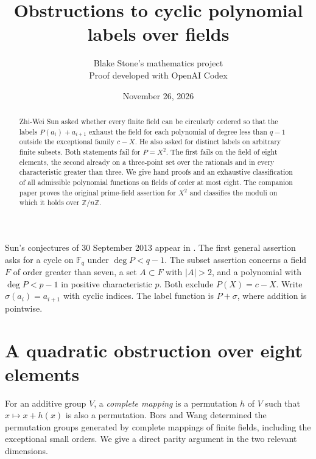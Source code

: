 \documentclass[10pt]{article}
\title{Obstructions to cyclic polynomial labels over fields}
\author{Blake Stone's mathematics project\\\small Proof developed with OpenAI Codex}
\date{November 26, 2026}
\newcommand{\F}{\mathbb F}
\begin{document}
\maketitle
\begin{abstract}
Zhi-Wei Sun asked whether every finite field can be circularly ordered so that the labels $P(a_i)+a_{i+1}$ exhaust the field for each polynomial of degree less than $q-1$ outside the exceptional family $c-X$. He also asked for distinct labels on arbitrary finite subsets. Both statements fail for $P=X^2$. The first fails on the field of eight elements, the second already on a three-point set over the rationals and in every characteristic greater than three. We give hand proofs and an exhaustive classification of all admissible polynomial functions on fields of order at most eight. The companion paper proves the original prime-field assertion for $X^2$ and classifies the moduli on which it holds over $\mathbb Z/n\mathbb Z$.
\end{abstract}

Sun's conjectures of 30 September 2013 appear in \cite{sun,oeis}. The first general assertion asks for a cycle on $\F_q$ under $\deg P<q-1$. The subset assertion concerns a field $F$ of order greater than seven, a set $A\subset F$ with $|A|>2$, and a polynomial with $\deg P<p-1$ in positive characteristic $p$. Both exclude $P(X)=c-X$. Write $\sigma(a_i)=a_{i+1}$ with cyclic indices. The label function is $P+\sigma$, where addition is pointwise.

\section{A quadratic obstruction over eight elements}
For an additive group $V$, a \emph{complete mapping} is a permutation $h$ of $V$ such that $x\mapsto x+h(x)$ is also a permutation. Bors and Wang \cite{bors} determined the permutation groups generated by complete mappings of finite fields, including the exceptional small orders. We give a direct parity argument in the two relevant dimensions.
\end{document}
